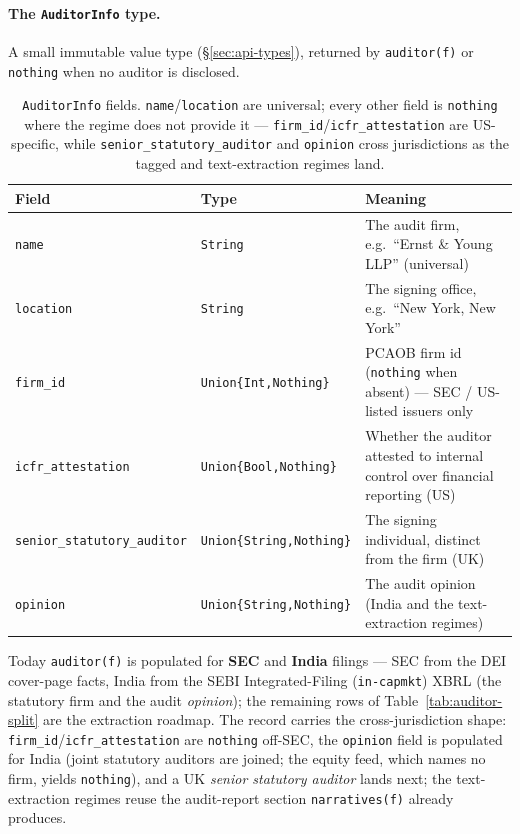 \documentclass[11pt,a4paper]{report}
\begin{document}
\paragraph{The \texttt{AuditorInfo} type.} A small immutable value type (\S\ref{sec:api-types}), returned by
\texttt{auditor(f)} or \texttt{nothing} when no auditor is disclosed.

\begin{table}[h]
\centering
\small
\caption{\texttt{AuditorInfo} fields. \texttt{name}/\texttt{location} are universal; every other field is
\texttt{nothing} where the regime does not provide it --- \texttt{firm\_id}/\texttt{icfr\_attestation} are
US-specific, while \texttt{senior\_statutory\_auditor} and \texttt{opinion} cross jurisdictions as the
tagged and text-extraction regimes land.}
\label{tab:auditorinfo}
\begin{tabular}{@{}p{}p{}p{}@{}}
\toprule
\textbf{Field} & \textbf{Type} & \textbf{Meaning} \\
\midrule
\texttt{name} & \texttt{String} & The audit firm, e.g.\ ``Ernst \& Young LLP'' (universal) \\
\texttt{location} & \texttt{String} & The signing office, e.g.\ ``New York, New York'' \\
\texttt{firm\_id} & \texttt{Union\{Int,Nothing\}} & PCAOB firm id (\texttt{nothing} when absent) --- SEC / US-listed issuers only \\
\texttt{icfr\_attestation} & \texttt{Union\{Bool,Nothing\}} & Whether the auditor attested to internal control over financial reporting (US) \\
\texttt{senior\_statutory\_auditor} & \texttt{Union\{String,Nothing\}} & The signing individual, distinct from the firm (UK) \\
\texttt{opinion} & \texttt{Union\{String,Nothing\}} & The audit opinion (India and the text-extraction regimes) \\
\bottomrule
\end{tabular}
\end{table}

\noindent Today \texttt{auditor(f)} is populated for \textbf{SEC} and \textbf{India} filings --- SEC from the
DEI cover-page facts, India from the SEBI Integrated-Filing (\texttt{in-capmkt}) XBRL (the statutory firm and
the audit \emph{opinion}); the remaining rows of Table~\ref{tab:auditor-split} are the extraction roadmap. The
record carries the cross-jurisdiction shape: \texttt{firm\_id}/\texttt{icfr\_attestation} are \texttt{nothing}
off-SEC, the \texttt{opinion} field is populated for India (joint statutory auditors are joined; the equity
feed, which names no firm, yields \texttt{nothing}), and a UK \emph{senior statutory auditor} lands next; the
text-extraction regimes reuse the audit-report section \texttt{narratives(f)} already produces.
\end{document}
